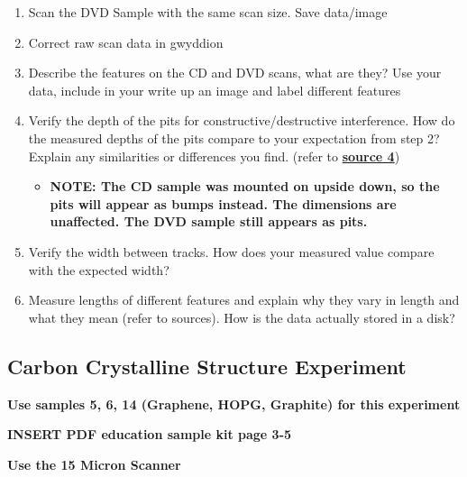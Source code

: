 \documentclass{../lab}
\begin{document}
\begin{enumerate}
    \item Scan the DVD Sample with the same scan size.  Save data/image

    \item Correct raw scan data in gwyddion

    \item Describe the features on the CD and DVD scans, what are they? Use your data, include in your write up an image and label different features

    \item Verify the depth of the pits for constructive/destructive interference. How do the measured depths of the pits compare to your expectation from step 2?  Explain any similarities or differences you find.  (refer to \href{http://www.scientificamerican.com/article/how-do-rewriteable-cds-wo/}{\textbf{source 4}})

    \begin{itemize}
        \item ​​\textbf{NOTE: The CD sample was mounted on upside down, so the pits will appear as bumps instead.  The dimensions are unaffected.  The DVD sample still appears as pits.}

    \end{itemize}

    \item Verify the width between tracks. How does your measured value compare with the expected width?

    \item Measure lengths of different features and explain why they vary in length and what they mean (refer to sources).  How is the data actually stored in a disk?

\end{enumerate}

\subsection{Carbon Crystalline Structure Experiment}

\textbf{Use samples 5, 6, 14 (Graphene, HOPG, Graphite) for this experiment}

\textbf{INSERT PDF education sample kit page 3-5}

\textbf{Use the 15 Micron Scanner }
\end{document}
